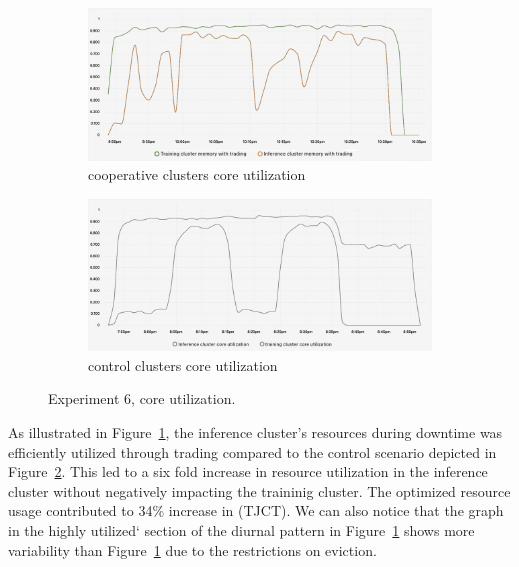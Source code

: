 \begin{figure}[H]
\centering
\begin{subfigure}{.5\textwidth}
  \centering
  \includegraphics[width=.9\linewidth]{./figures/experiment-six/trading.png}
  \caption{cooperative clusters core utilization}
  \label{fig:exp6coop}
\end{subfigure}%
\begin{subfigure}{.5\textwidth}
  \centering
  \includegraphics[width=.9\linewidth]{./figures/experiment-six/control.png}
  \caption{control clusters core utilization}
  \label{fig:exp6control}
\end{subfigure}
\caption{Experiment 6, core utilization.}
\label{fig:exp6coreutil}
\end{figure}

As illustrated in Figure~\ref{fig:exp6coop}, the inference cluster's resources
during downtime was efficiently utilized through trading compared to the
control scenario depicted in Figure~\ref{fig:exp6control}. This led to a six
fold increase in resource utilization in the inference cluster without
negatively impacting the traininig cluster. The optimized resource usage
contributed to 34\% increase in (TJCT). We can also notice that the graph in
the highly utilized` section of the diurnal pattern in Figure~\ref{fig:exp6coop} shows
more variability than Figure~\ref{fig:exp6coop} due to the restrictions on eviction.
